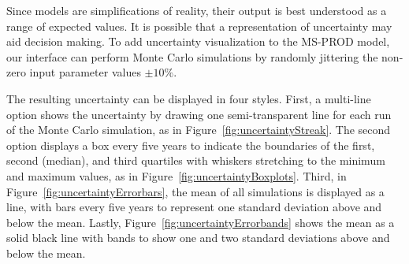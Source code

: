 Since models are simplifications of reality, their output is best understood as a range of expected values.  It is possible that a representation of uncertainty may aid decision making.  To add uncertainty visualization to the MS-PROD model, our interface can perform Monte Carlo simulations by randomly jittering the non-zero input parameter values $\pm 10\%$.

The resulting uncertainty can be displayed in four styles.  First, a multi-line option shows the uncertainty by drawing one semi-transparent line for each run of the Monte Carlo simulation, as in Figure~\ref{fig:uncertaintyStreak}. The second option displays a box every five years to indicate the boundaries of the first, second (median), and third quartiles with whiskers stretching to the minimum and maximum values, as in Figure~\ref{fig:uncertaintyBoxplots}.  Third, in Figure~\ref{fig:uncertaintyErrorbars}, the mean of all simulations is displayed as a line, with bars every five years to represent one standard deviation above and below the mean.  Lastly, Figure~\ref{fig:uncertaintyErrorbands} shows the mean as a solid black line with bands to show one and two standard deviations above and below the mean.
